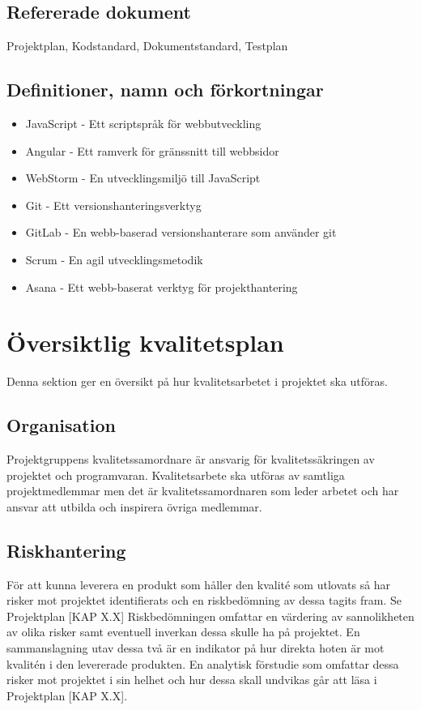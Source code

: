 \documentclass[a4paper,10pt]{article}
\begin{document}
\subsection{Refererade dokument}
Projektplan, Kodstandard, Dokumentstandard, Testplan
\subsection{Definitioner, namn och förkortningar}

\begin{itemize}
\vspace{5mm}
    \item JavaScript - Ett scriptspråk för webbutveckling
    \item Angular - Ett ramverk för gränssnitt till webbsidor
    \item WebStorm - En utvecklingsmiljö till JavaScript
    \item Git - Ett versionshanteringsverktyg
    \item GitLab - En webb-baserad versionshanterare som använder git
    \item Scrum - En agil utvecklingsmetodik
    \item Asana - Ett webb-baserat verktyg för projekthantering
\end{itemize}

\section{Översiktlig kvalitetsplan}

Denna sektion ger en översikt på hur kvalitetsarbetet i projektet ska utföras.

\subsection{Organisation}

Projektgruppens kvalitetssamordnare är ansvarig för kvalitetssäkringen av projektet och  programvaran. Kvalitetsarbete ska utföras av samtliga projektmedlemmar men det är kvalitetssamordnaren som leder arbetet och har ansvar att utbilda och inspirera övriga medlemmar.

\subsection{Riskhantering}

För att kunna leverera en produkt som håller den kvalité som utlovats så har risker mot projektet identifierats och en riskbedömning av dessa tagits fram. Se Projektplan [KAP X.X] 
Riskbedömningen omfattar en värdering av sannolikheten av olika risker samt eventuell inverkan dessa skulle ha på projektet. En sammanslagning utav dessa två är en indikator på hur direkta hoten är mot kvalitén i den levererade produkten.
En analytisk förstudie som omfattar dessa risker mot projektet i sin helhet och hur dessa skall undvikas går att läsa i Projektplan [KAP X.X]. 
\end{document}

